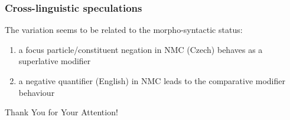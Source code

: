 \documentclass[10pt
]{beamer}
\begin{document}
\begin{frame}
  \frametitle{Cross-linguistic speculations}


  The variation seems to be related to  the morpho-syntactic status:
  
  \begin{enumerate}
    \item a focus particle/constituent negation in NMC (Czech) behaves as a superlative modifier
    \item a negative quantifier (English) in NMC leads to the comparative modifier behaviour
  \end{enumerate}

\end{frame}

\begin{frame}[plain]
\vfill
\centerline{Thank You for Your Attention!}
\vfill\vfill
\end{frame}

\section{\bibname}
\begin{frame}[t, allowframebreaks]{\bibname}
\printbibliography[heading=none]
\end{frame}
\end{document}
